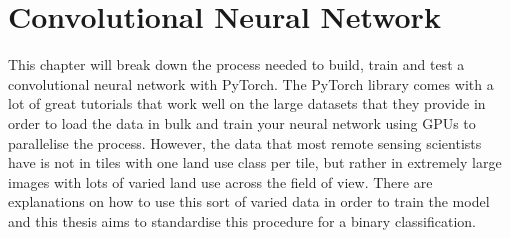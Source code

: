 \chapter{Convolutional Neural Network}
This chapter will break down the process needed to build, train and test a convolutional neural network with PyTorch. The PyTorch library comes with a lot of great tutorials that work well on the large datasets that they provide in order to load the data in bulk and train your neural network using GPUs to parallelise the process. However, the data that most remote sensing scientists have is not in tiles with one land use class per tile, but rather in extremely large images with lots of varied land use across the field of view. There are explanations on how to use this sort of varied data in order to train the model and this thesis aims to standardise this procedure for a binary classification. \newline

